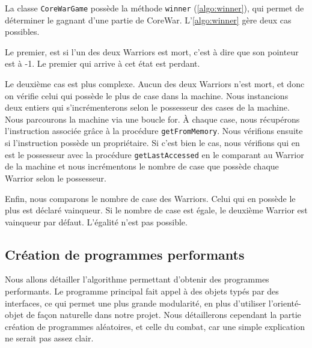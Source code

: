 \documentclass[hidelinks]{report}
\begin{document}
La classe \texttt{CoreWarGame} possède la méthode \texttt{winner} (\autoref{algo:winner}), qui permet de déterminer le gagnant d'une partie de CoreWar. L'\autoref{algo:winner} gère deux cas possibles. 

Le premier, est si l'un des deux Warriors est mort, c'est à dire que son pointeur est à -1. Le premier qui arrive à cet état est perdant.

Le deuxième cas est plus complexe. Aucun des deux Warriors n'est mort, et donc on vérifie celui qui possède le plus de case dans la machine. Nous instancions deux entiers qui s'incrémenterons selon le possesseur des cases de la machine. Nous parcourons la machine via une boucle for. À chaque case, nous récupérons l'instruction associée grâce à la procédure \texttt{getFromMemory}. Nous vérifions ensuite si l'instruction possède un propriétaire. Si c'est bien le cas, nous vérifions qui en est le possesseur avec la procédure \texttt{getLastAccessed} en le comparant au Warrior de la machine et nous incrémentons le nombre de case que possède chaque Warrior selon le possesseur.

Enfin, nous comparons le nombre de case des Warriors. Celui qui en possède le plus est déclaré vainqueur. Si le nombre de case est égale, le deuxième Warrior est vainqueur par défaut. L'égalité n'est pas possible.

\subsection{Création de programmes performants}
Nous allons détailler l'algorithme permettant d'obtenir des programmes performants. Le programme principal fait appel à des objets typés par des interfaces, ce qui permet une plus grande modularité, en plus d'utiliser l'orienté-objet de façon naturelle dans notre projet. Nous détaillerons cependant la partie création de programmes aléatoires, et celle du combat, car une simple explication ne serait pas assez clair.
\end{document}
